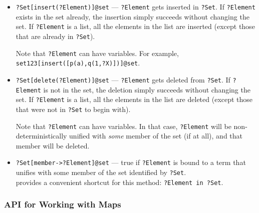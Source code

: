 \begin{itemize}
\item  \texttt{?Set[insert(?Element)]@\bs{}set} --- \texttt{?Element} gets
  inserted in \texttt{?Set}. If \texttt{?Element} exists in the set already,
  the insertion simply succeeds without changing the set.
  If \texttt{?Element} is a list, all the elements in the list are inserted
  (except those that are already in \texttt{?Set}).  

  Note that \texttt{?Element} can have variables. 
  For example, \texttt{set123[insert([p(a),q(1,?X)])]@\bs{}set}. 
\item \texttt{?Set[delete(?Element)]@\bs{}set} --- \texttt{?Element} gets
  deleted from \texttt{?Set}. If \texttt{?Element} is not in the set,
  the deletion simply succeeds without changing the set.
  If \texttt{?Element} is a list, all the elements in the list are deleted
  (except those that were not in \texttt{?Set} to begin with). 
  
  Note that \texttt{?Element} can have variables. In that case,
  \texttt{?Element} will be non-deterministically
  unified with \emph{some} member of the set (if
  at all), and that member will be deleted.  
\item \texttt{?Set[member->?Element]@\bs{}set} --- true if
  \texttt{?Element} is bound to a term that unifies with some member of the
  set identified by \texttt{?Set}.
  \\
  \ERGO provides a convenient shortcut for this method: \texttt{?Element
    \bs{}in ?Set}.  
\end{itemize}

\subsubsection{API for Working with Maps} \label{sec-api-map}

